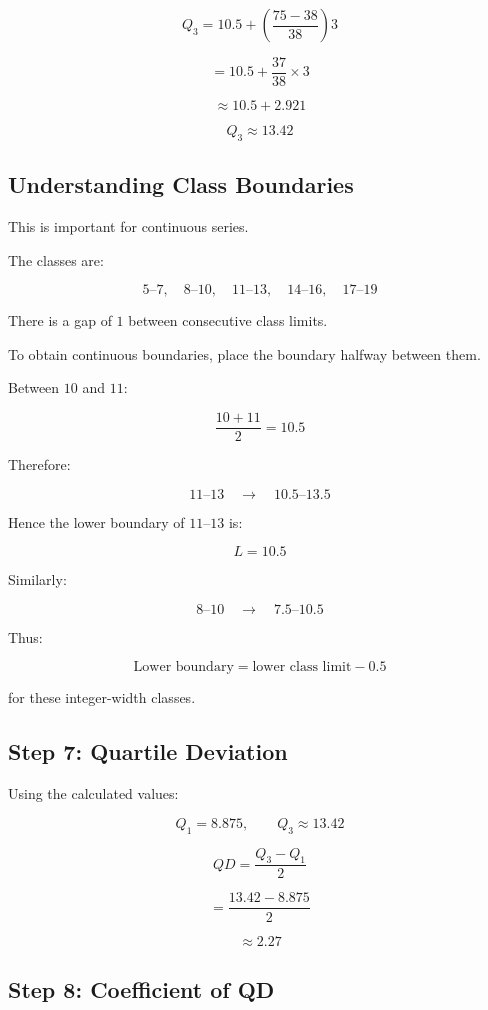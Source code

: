 \documentclass[12pt,a4paper]{article}
\begin{document}
\[
Q_3
=
10.5+
\left(
\frac{75-38}{38}
\right)3
\]

\[
=
10.5+\frac{37}{38}\times3
\]

\[
\approx10.5+2.921
\]

\[
\boxed{Q_3\approx13.42}
\]

\subsection{Understanding Class Boundaries}

This is important for continuous series.

The classes are:

\[
5\text{--}7,\quad
8\text{--}10,\quad
11\text{--}13,\quad
14\text{--}16,\quad
17\text{--}19
\]

There is a gap of $1$ between consecutive class limits.

To obtain continuous boundaries, place the boundary halfway between them.

Between $10$ and $11$:

\[
\frac{10+11}{2}=10.5
\]

Therefore:

\[
11\text{--}13
\quad\longrightarrow\quad
10.5\text{--}13.5
\]

Hence the lower boundary of $11$--$13$ is:

\[
\boxed{L=10.5}
\]

Similarly:

\[
8\text{--}10
\quad\longrightarrow\quad
7.5\text{--}10.5
\]

Thus:

\[
\boxed{\text{Lower boundary}=\text{lower class limit}-0.5}
\]

for these integer-width classes.

\subsection*{Step 7: Quartile Deviation}

Using the calculated values:

\[
Q_1=8.875,\qquad Q_3\approx13.42
\]

\[
QD=\frac{Q_3-Q_1}{2}
\]

\[
=
\frac{13.42-8.875}{2}
\]

\[
\approx\boxed{2.27}
\]

\subsection*{Step 8: Coefficient of QD}
\end{document}

